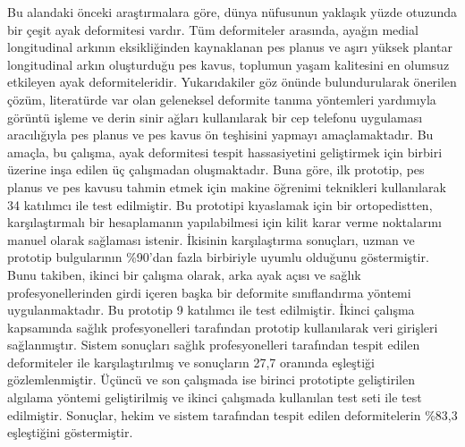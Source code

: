 \begin{ozet}
Bu alandaki önceki araştırmalara göre, dünya nüfusunun yaklaşık yüzde otuzunda bir çeşit ayak deformitesi vardır. Tüm deformiteler arasında, ayağın medial longitudinal arkının eksikliğinden kaynaklanan pes planus ve aşırı yüksek plantar longitudinal arkın oluşturduğu pes kavus, toplumun yaşam kalitesini en olumsuz etkileyen ayak deformiteleridir. Yukarıdakiler göz önünde bulundurularak önerilen çözüm, literatürde var olan geleneksel deformite tanıma yöntemleri yardımıyla görüntü işleme ve derin sinir ağları kullanılarak bir cep telefonu uygulaması aracılığıyla pes planus ve pes kavus ön teşhisini yapmayı amaçlamaktadır. Bu amaçla, bu çalışma, ayak deformitesi tespit hassasiyetini geliştirmek için birbiri üzerine inşa edilen üç çalışmadan oluşmaktadır. Buna göre, ilk prototip, pes planus ve pes kavusu tahmin etmek için makine öğrenimi teknikleri kullanılarak 34 katılımcı ile test edilmiştir. Bu prototipi kıyaslamak için bir ortopedistten, karşılaştırmalı bir hesaplamanın yapılabilmesi için kilit karar verme noktalarını manuel olarak sağlaması istenir. İkisinin karşılaştırma sonuçları, uzman ve prototip bulgularının \%90'dan fazla birbiriyle uyumlu olduğunu göstermiştir. Bunu takiben, ikinci bir çalışma olarak, arka ayak açısı ve sağlık profesyonellerinden girdi içeren başka bir deformite sınıflandırma yöntemi uygulanmaktadır. Bu prototip 9 katılımcı ile test edilmiştir. İkinci çalışma kapsamında sağlık profesyonelleri tarafından prototip kullanılarak veri girişleri sağlanmıştır. Sistem sonuçları sağlık profesyonelleri tarafından tespit edilen deformiteler ile karşılaştırılmış ve sonuçların 27,7 oranında eşleştiği gözlemlenmiştir. Üçüncü ve son çalışmada ise birinci prototipte geliştirilen algılama yöntemi geliştirilmiş ve ikinci çalışmada kullanılan test seti ile test edilmiştir. Sonuçlar, hekim ve sistem tarafından tespit edilen deformitelerin \%83,3 eşleştiğini göstermiştir.
\end{ozet}
